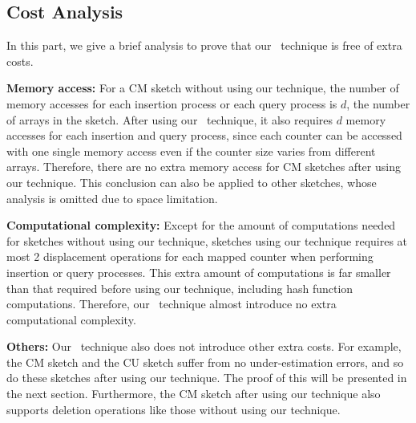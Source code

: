 \presub
\subsection{Cost Analysis} \postsub

In this part, we give a brief analysis to prove that our \aname~technique is free of extra costs.

\noindent\textbf{Memory access: }For a CM sketch without using our technique, the number of memory accesses for each insertion process or each query process is $d$, the number of arrays in the sketch. After using our \aname~technique, it also requires $d$ memory accesses for each insertion and query process, since each counter can be accessed with one single memory access even if the counter size varies from different arrays. Therefore, there are no extra memory access for CM sketches after using our technique.
This conclusion can also be applied to other sketches, whose analysis is omitted due to space limitation.

\noindent\textbf{Computational complexity: }Except for the amount of computations needed for sketches without using our technique, sketches using our technique requires at most 2 displacement operations for each mapped counter when performing insertion or query processes.
This extra amount of computations is far smaller than that required before using our technique, including hash function computations.
Therefore, our \aname~technique almost introduce no extra computational complexity.

\noindent\textbf{Others: }Our \aname~technique also does not introduce other extra costs. For example, the CM sketch and the CU sketch suffer from no under-estimation errors, and so do these sketches after using our technique. The proof of this will be presented in the next section.
Furthermore, the CM sketch after using our technique also supports deletion operations like those without using our technique.